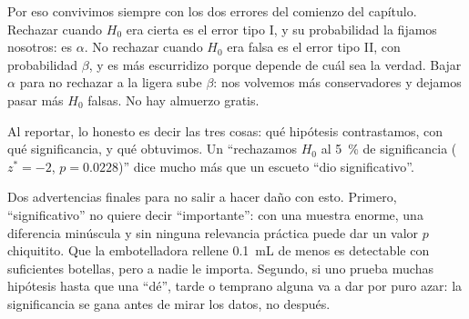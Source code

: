Por eso convivimos siempre con los dos errores del comienzo del capítulo. Rechazar cuando \(H_0\) era cierta es el error tipo I, y su probabilidad la fijamos nosotros: es \(\alpha\). No rechazar cuando \(H_0\) era falsa es el error tipo II, con probabilidad \(\beta\), y es más escurridizo porque depende de cuál sea la verdad. Bajar \(\alpha\) para no rechazar a la ligera sube \(\beta\): nos volvemos más conservadores y dejamos pasar más \(H_0\) falsas. No hay almuerzo gratis.

Al reportar, lo honesto es decir las tres cosas: qué hipótesis contrastamos, con qué significancia, y qué obtuvimos. Un \enquote{rechazamos \(H_0\) al \qty{5}{\percent} de significancia (\(z^*=-2\), \(p=\num{0,0228}\))} dice mucho más que un escueto \enquote{dio significativo}.

Dos advertencias finales para no salir a hacer daño con esto. Primero, \enquote{significativo} no quiere decir \enquote{importante}: con una muestra enorme, una diferencia minúscula y sin ninguna relevancia práctica puede dar un valor \(p\) chiquitito. Que la embotelladora rellene \qty{0,1}{\milli\liter} de menos es detectable con suficientes botellas, pero a nadie le importa. Segundo, si uno prueba muchas hipótesis hasta que una \enquote{dé}, tarde o temprano alguna va a dar por puro azar: la significancia se gana antes de mirar los datos, no después.